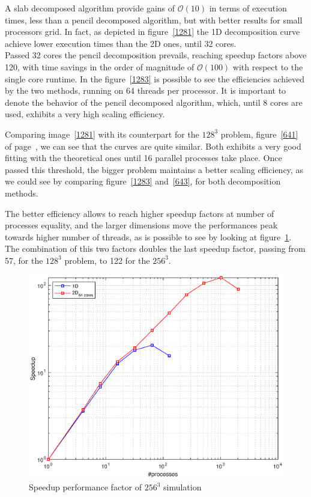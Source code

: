 A slab decomposed algorithm provide gains of $\mathcal{O}(10)$ in terms of execution times, less than a pencil decomposed algorithm, but with better results for small processors grid. In fact, as depicted in figure~\ref{1281} the 1D decomposition curve achieve lower execution times than the 2D ones, until 32 cores.\\
Passed 32 cores the pencil decomposition prevails, reaching speedup factors above 120, with time savings in the order of magnitude of $\mathcal{O}(100)$ with respect to the single core runtime.
In the figure~\ref{1283} is possible to see the efficiencies achieved by the two methods, running on 64 threads per processor. It is important to denote the behavior of the pencil decomposed algorithm, which, until 8 cores are used, exhibits a very high scaling efficiency. \\
\par
Comparing image~\ref{1281} with its counterpart for the $128^{3}$ problem, figure~\ref{641} of page~\pageref{641}, we can see that the curves are quite similar. Both exhibits a very good fitting with the theoretical ones until 16 parallel processes take place. Once passed this threshold, the bigger problem maintains a better scaling efficiency, as we could see by comparing figure~\ref{1283} and~\ref{643}, for both decomposition methods. \par
The better efficiency allows to reach higher speedup factors at number of processes equality, and the larger dimensions move the performances peak towards higher number of threads, as is possible to see by looking at figure~\ref{1282}. The combination of this two factors doubles the last speedup factor, passing from 57, for the $128^{3}$ problem, to 122 for the $256^{3}$.\\

\begin{figure}
\begin{center}
\includegraphics[scale=0.6]{grafici/1282}
\caption{Speedup performance factor of $256^{3}$ simulation}
\label{1282}
\end{center}
\end{figure}

